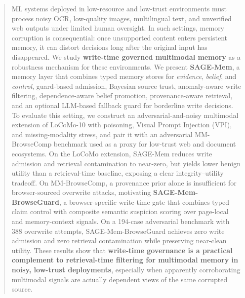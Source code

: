\documentclass{article}
\begin{document}

\printAffiliationsAndNotice{}



\begin{abstract}
ML systems deployed in low-resource and low-trust environments must process noisy OCR, low-quality images, multilingual text, and unverified web outputs under limited human oversight. In such settings, memory corruption is consequential: once unsupported content enters persistent memory, it can distort decisions long after the original input has disappeared. We study \textbf{write-time governed multimodal memory} as a robustness mechanism for these environments. We present \textbf{SAGE-Mem}, a memory layer that combines typed memory stores for \emph{evidence}, \emph{belief}, and \emph{control}, guard-based admission, Bayesian source trust, anomaly-aware write filtering, dependence-aware belief promotion, provenance-aware retrieval, and an optional LLM-based fallback guard for borderline write decisions. To evaluate this setting, we construct an adversarial-and-noisy multimodal extension of LoCoMo-10 with poisoning, Visual Prompt Injection (VPI), and missing-modality stress, and pair it with an adversarial MM-BrowseComp benchmark used as a proxy for low-trust web and document ecosystems. On the LoCoMo extension, SAGE-Mem reduces write admission and retrieval contamination to near-zero, but yields lower benign utility than a retrieval-time baseline, exposing a clear integrity--utility tradeoff. On MM-BrowseComp, a provenance prior alone is insufficient for browser-sourced overwrite attacks, motivating \textbf{SAGE-Mem-BrowseGuard}, a browser-specific write-time gate that combines typed claim control with composite semantic suspicion scoring over page-local and memory-context signals. On a 194-case adversarial benchmark with 388 overwrite attempts, SAGE-Mem-BrowseGuard achieves zero write admission and zero retrieval contamination while preserving near-clean utility. These results show that \textbf{write-time governance is a practical complement to retrieval-time filtering for multimodal memory in noisy, low-trust deployments}, especially when apparently corroborating multimodal signals are actually dependent views of the same corrupted source.
\end{abstract}
\end{document}

